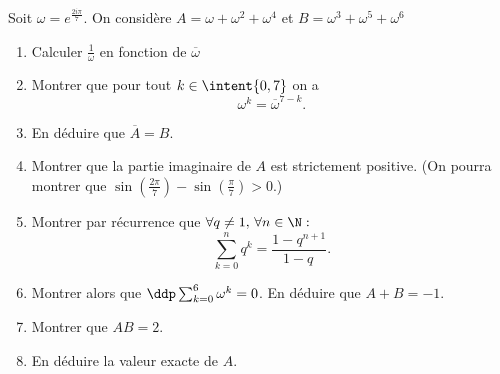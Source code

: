 \documentclass[a4paper, 11pt,reqno]{article}
\begin{document}
\begin{exercice}
Soit $\omega =e^{\frac{2i\pi}{7}}$. On considère $A=\omega+\omega^2 +\omega^4$ et $B =\omega^3+\omega^5 +\omega^6$

\begin{enumerate}
\item Calculer $\frac{1}{\omega}$ en fonction de $\overline{\omega}$
\item Montrer que pour tout $k\in \intent{0,7}$ on a 
$$\omega^k =\overline{\omega}^{7-k}.$$
\item En déduire que $\overline{A}=B$.
\item Montrer que la partie imaginaire de $A$ est strictement positive. (On pourra montrer que $\sin\left( \frac{2\pi}{7}\right)-\sin\left( \frac{\pi}{7}\right)>0$.)
\item Montrer par récurrence que $\forall q\neq 1, \, \forall n\in \N : $
$$\sum_{k=0}^n q^k =\frac{1-q^{n+1}}{1-q\, }.$$
\item Montrer alors que $\ddp \sum_{k=0}^6 \omega^k =0$. En déduire que $A+B=-1$.
\item Montrer que $AB=2$. 

\item En déduire la valeur exacte de $A$.


\end{enumerate}
\end{exercice}
\end{document}
